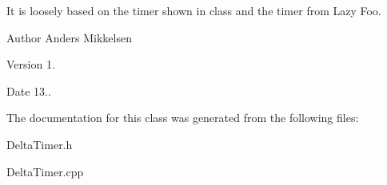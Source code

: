 It is loosely based on the timer shown in class and the timer from Lazy Foo.

\begin{DoxyAuthor}{Author}
Anders Mikkelsen 
\end{DoxyAuthor}
\begin{DoxyVersion}{Version}
1. 
\end{DoxyVersion}
\begin{DoxyDate}{Date}
13.. 
\end{DoxyDate}


The documentation for this class was generated from the following files\+:\begin{DoxyCompactItemize}
\item 
Delta\+Timer.\+h\item 
Delta\+Timer.\+cpp\end{DoxyCompactItemize}
